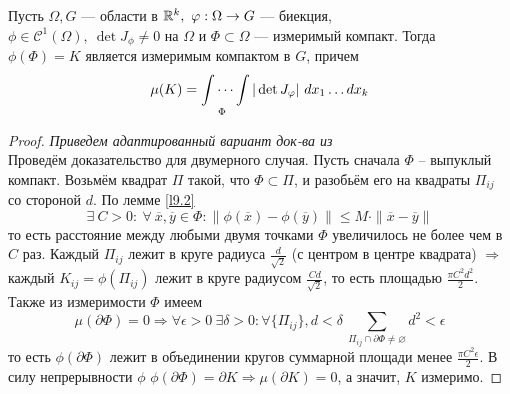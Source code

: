 \begin{theorem}\label{th10.1}
    Пусть $\Omega, G$ --- области в $\mathbb{R}^k,\ \varphi:\Omega\to G$ --- биекция,\\
    $\phi\in \mathcal{C}^1(\Omega),\ \det J_{\phi}\neq 0$ на $\Omega$ и $\Phi \subset \Omega$ --- измеримый компакт.
    Тогда $\phi(\Phi)=K$ является измеримым компактом в $G$, причем
    \[\mu(K)=\idotsint\limits_{\Phi}|\det{J_{\phi}}|\ dx_1\dots dx_k\]
\end{theorem}
\begin{proof}
    \textit{Приведем адаптированный вариант док-ва из \cite{podolsky}}\\
    Проведём доказательство для двумерного случая.
    Пусть сначала $\Phi$ -- выпуклый компакт. Возьмём квадрат $\Pi$ такой, что $\Phi \subset \Pi$, и разобьём его на квадраты $\Pi_{ij}$ со стороной $d$. По лемме \ref{l9.2}
    \[\exists\ C>0:\ \forall\ \overline{x}, \overline{y}\in \Phi: \|\phi(\overline{x})-\phi(\overline{y})\|\leq M\cdot \|\overline{x}-\overline{y}\|\]
    то есть расстояние между любыми двумя точками $\Phi$ увеличилось не более чем в $C$ раз. Каждый $\Pi_{ij}$ лежит в круге радиуса $\frac{d}{\sqrt{2}}$ (с центром в центре квадрата) $\Longrightarrow$ каждый $K_{ij} = \phi(\Pi_{ij})$ лежит в круге радиусом $\frac{Cd}{\sqrt{2}}$, то есть площадью $\frac{\pi C^2 d^2}{2}$.\\
    Также из измеримости $\Phi$ имеем \[\mu(\partial \Phi) = 0 \Longrightarrow \forall \epsilon > 0\ \exists \delta > 0: \forall \{\Pi_{ij}\}, d < \delta \ \sum\limits_{\Pi_{ij} \cap \partial\Phi \neq \varnothing} d^2 < \epsilon\]
    то есть $\phi(\partial\Phi)$ лежит в объединении кругов суммарной площади менее $\frac{\pi C^2 \epsilon}{2}$. В силу непрерывности $\phi$ $\phi(\partial\Phi) = \partial K \Longrightarrow \mu(\partial K) = 0$, а значит, $K$ измеримо.


\end{proof}
